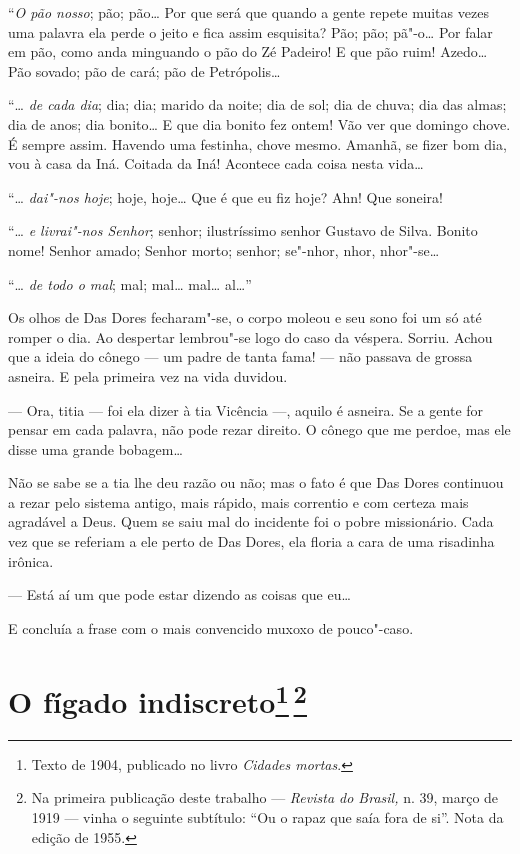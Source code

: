 ``\emph{O pão nosso}; pão; pão\ldots{} Por que será que quando a gente repete
muitas vezes uma palavra ela perde o jeito e fica assim esquisita? Pão;
pão; pã"-o\ldots{} Por falar em pão, como anda minguando o pão do Zé Padeiro!
E que pão ruim! Azedo\ldots{} Pão sovado; pão de cará; pão de Petrópolis\ldots{}

``\ldots{} \emph{de cada dia}; dia; dia; marido da noite; dia de sol; dia de
chuva; dia das almas; dia de anos; dia bonito\ldots{} E que dia bonito fez
ontem! Vão ver que domingo chove. É sempre assim. Havendo uma festinha,
chove mesmo. Amanhã, se fizer bom dia, vou à casa da Iná. Coitada da
Iná! Acontece cada coisa nesta vida\ldots{}

``\ldots{} \emph{dai"-nos hoje}; hoje, hoje\ldots{} Que é que eu fiz hoje? Ahn! Que
soneira!

``\ldots{} \emph{e livrai"-nos Senhor}; senhor; ilustríssimo senhor Gustavo de
Silva. Bonito nome! Senhor amado; Senhor morto; senhor; se"-nhor, nhor,
nhor"-se\ldots{}

``\ldots{} \emph{de todo o mal}; mal; mal\ldots{} mal\ldots{} al\ldots{}''

Os olhos de Das Dores fecharam"-se, o corpo moleou e seu sono foi um só
até romper o dia. Ao despertar lembrou"-se logo do caso da véspera.
Sorriu. Achou que a ideia do cônego --- um padre de tanta fama! --- não
passava de grossa asneira. E pela primeira vez na vida duvidou.

--- Ora, titia --- foi ela dizer à tia Vicência ---, aquilo é asneira.
Se a gente for pensar em cada palavra, não pode rezar direito. O cônego
que me perdoe, mas ele disse uma grande bobagem\ldots{}

Não se sabe se a tia lhe deu razão ou não; mas o fato é que Das Dores
continuou a rezar pelo sistema antigo, mais rápido, mais correntio e com
certeza mais agradável a Deus. Quem se saiu mal do incidente foi o pobre
missionário. Cada vez que se referiam a ele perto de Das Dores, ela
floria a cara de uma risadinha irônica.

--- Está aí um que pode estar dizendo as coisas que eu\ldots{}

E concluía a frase com o mais convencido muxoxo de pouco"-caso.

\chapter{O fígado indiscreto\footnote[*]{Texto de 1904, publicado no livro \emph{Cidades mortas}.}\,\footnote[**]{Na primeira publicação
  deste trabalho --- \emph{Revista do Brasil,} n. 39, março de 1919 ---
  vinha o seguinte subtítulo: ``Ou o rapaz que saía fora de si''. Nota
  da edição de 1955.}}

